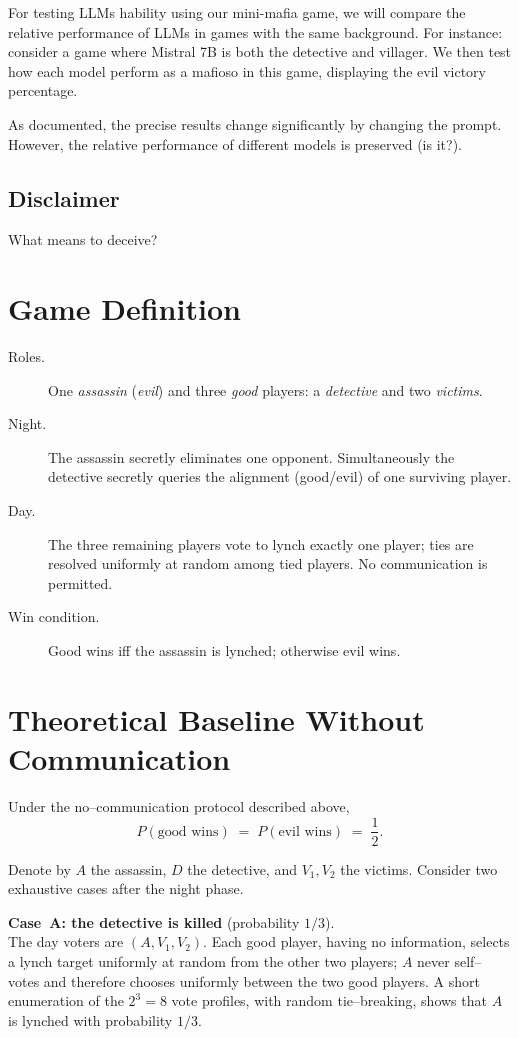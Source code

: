 \documentclass{article}
\begin{document}
For testing LLMs hability using our mini-mafia game, we will compare the relative performance of LLMs in games with the same background. For instance: consider a game where Mistral 7B is both the detective and villager. We then test how each model perform as a mafioso in this game, displaying the evil victory percentage.

As documented, the precise results change significantly by changing the prompt. However, the relative performance of different models is preserved (is it?). 




\subsection{Disclaimer}

What means to deceive? 



\section{Game Definition}
\begin{description}
  \item[Roles.] One \emph{assassin} (\emph{evil}) and three \emph{good} players: a \emph{detective} and two \emph{victims}.
  \item[Night.] The assassin secretly eliminates one opponent.  Simultaneously the detective secretly queries the alignment (good/evil) of one surviving player.
  \item[Day.] The three remaining players vote to lynch exactly one player; ties are resolved uniformly at random among tied players.  No communication is permitted.
  \item[Win condition.]  Good wins iff the assassin is lynched; otherwise evil wins.
\end{description}

\section{Theoretical Baseline Without Communication}

Under the no--communication protocol described above,
\[
P(\text{good wins}) \;=\; P(\text{evil wins}) \;=\; \frac12 .
\]

Denote by $A$ the assassin, $D$ the detective, and $V_1,V_2$ the victims.  Consider two exhaustive cases after the night phase.

\smallskip
\noindent\textbf{Case~A: the detective is killed} (probability $1/3$).\\
The day voters are $(A,V_1,V_2)$.  Each good player, having no information, selects a lynch target uniformly at random from the other two players; $A$ never self--votes and therefore chooses uniformly between the two good players.  A short enumeration of the $2^3=8$ vote profiles, with random tie--breaking, shows that $A$ is lynched with probability $1/3$.
\end{document}
